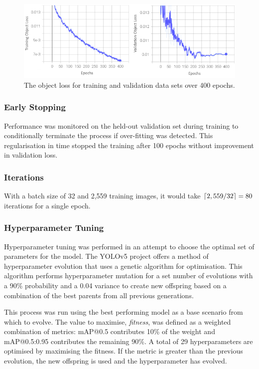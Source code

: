 \documentclass{thesis}
\begin{document}
\begin{figure}[h]
    \centering
    \includegraphics[scale=0.75]{images/train-val-obj-loss.png}
    \caption{The object loss for training and validation data sets over 400 epochs.}
    \label{fig:epochs}
\end{figure}

\subsubsection{Early Stopping}

Performance was monitored on the held-out validation set during training to conditionally terminate the process if over-fitting was detected. This regularisation in time stopped the training after 100 epochs without improvement in validation loss.

\subsubsection{Iterations} 

With a batch size of 32 and 2,559 training images, it would take $\lceil2,559 / 32\rceil = 80$ iterations for a single epoch.

\subsubsection{Hyperparameter Tuning}

Hyperparameter tuning was performed in an attempt to choose the optimal set of parameters for the model. The YOLOv5 project offers a method of hyperparameter evolution that uses a genetic algorithm for optimisation. This algorithm performs hyperparameter mutation for a set number of evolutions with a 90\% probability and a 0.04 variance to create new offspring based on a combination of the best parents from all previous generations. 

This process was run using the best performing model as a base scenario from which to evolve. The value to maximise, \textit{fitness}, was defined as a weighted combination of metrics: mAP@0.5 contributes 10\% of the weight and mAP@0.5:0.95 contributes the remaining 90\%. A total of 29 hyperparameters are optimised by maximising the fitness. If the metric is greater than the previous evolution, the new offspring is used and the hyperparameter has evolved. 
\end{document}
